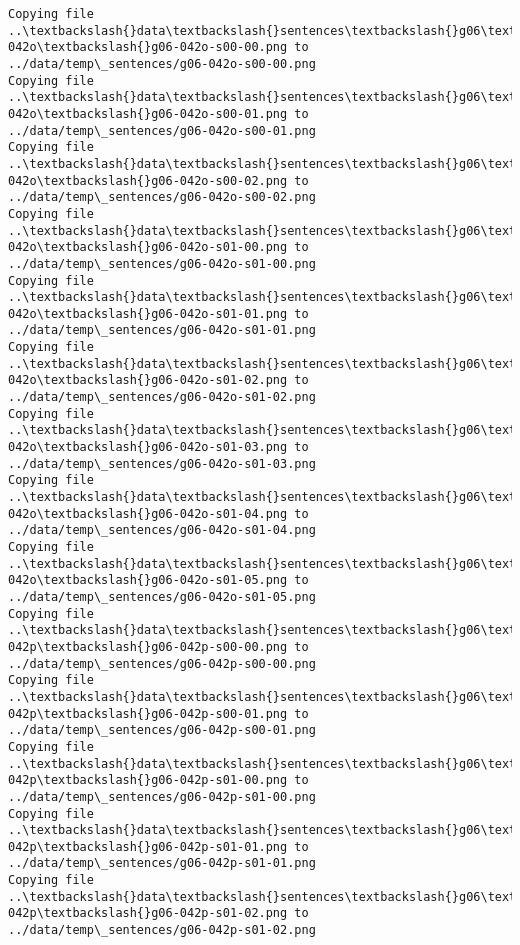 \documentclass[11pt]{article}
\begin{document}
\begin{Verbatim}[commandchars=\\\{\}]
Copying file ..\textbackslash{}data\textbackslash{}sentences\textbackslash{}g06\textbackslash{}g06-042o\textbackslash{}g06-042o-s00-00.png to
../data/temp\_sentences/g06-042o-s00-00.png
Copying file ..\textbackslash{}data\textbackslash{}sentences\textbackslash{}g06\textbackslash{}g06-042o\textbackslash{}g06-042o-s00-01.png to
../data/temp\_sentences/g06-042o-s00-01.png
Copying file ..\textbackslash{}data\textbackslash{}sentences\textbackslash{}g06\textbackslash{}g06-042o\textbackslash{}g06-042o-s00-02.png to
../data/temp\_sentences/g06-042o-s00-02.png
Copying file ..\textbackslash{}data\textbackslash{}sentences\textbackslash{}g06\textbackslash{}g06-042o\textbackslash{}g06-042o-s01-00.png to
../data/temp\_sentences/g06-042o-s01-00.png
Copying file ..\textbackslash{}data\textbackslash{}sentences\textbackslash{}g06\textbackslash{}g06-042o\textbackslash{}g06-042o-s01-01.png to
../data/temp\_sentences/g06-042o-s01-01.png
Copying file ..\textbackslash{}data\textbackslash{}sentences\textbackslash{}g06\textbackslash{}g06-042o\textbackslash{}g06-042o-s01-02.png to
../data/temp\_sentences/g06-042o-s01-02.png
Copying file ..\textbackslash{}data\textbackslash{}sentences\textbackslash{}g06\textbackslash{}g06-042o\textbackslash{}g06-042o-s01-03.png to
../data/temp\_sentences/g06-042o-s01-03.png
Copying file ..\textbackslash{}data\textbackslash{}sentences\textbackslash{}g06\textbackslash{}g06-042o\textbackslash{}g06-042o-s01-04.png to
../data/temp\_sentences/g06-042o-s01-04.png
Copying file ..\textbackslash{}data\textbackslash{}sentences\textbackslash{}g06\textbackslash{}g06-042o\textbackslash{}g06-042o-s01-05.png to
../data/temp\_sentences/g06-042o-s01-05.png
Copying file ..\textbackslash{}data\textbackslash{}sentences\textbackslash{}g06\textbackslash{}g06-042p\textbackslash{}g06-042p-s00-00.png to
../data/temp\_sentences/g06-042p-s00-00.png
Copying file ..\textbackslash{}data\textbackslash{}sentences\textbackslash{}g06\textbackslash{}g06-042p\textbackslash{}g06-042p-s00-01.png to
../data/temp\_sentences/g06-042p-s00-01.png
Copying file ..\textbackslash{}data\textbackslash{}sentences\textbackslash{}g06\textbackslash{}g06-042p\textbackslash{}g06-042p-s01-00.png to
../data/temp\_sentences/g06-042p-s01-00.png
Copying file ..\textbackslash{}data\textbackslash{}sentences\textbackslash{}g06\textbackslash{}g06-042p\textbackslash{}g06-042p-s01-01.png to
../data/temp\_sentences/g06-042p-s01-01.png
Copying file ..\textbackslash{}data\textbackslash{}sentences\textbackslash{}g06\textbackslash{}g06-042p\textbackslash{}g06-042p-s01-02.png to
../data/temp\_sentences/g06-042p-s01-02.png

\end{Verbatim}
\end{document}
